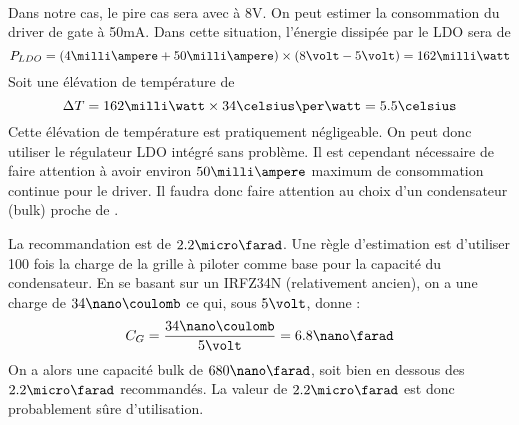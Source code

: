 \paragraph{}
Dans notre cas, le pire cas sera avec \vout{} à 8V.
On peut estimer la consommation du driver de gate à 50mA.
Dans cette situation, l'énergie dissipée par le LDO sera de 
$$P_{LDO} = (4\milli \ampere + 50 \milli \ampere ) \times (8 \volt - 5\volt) = 162 \milli\watt $$
Soit une élévation de température de 
$$\Delta T = 162 \milli \watt \times 34\celsius\per\watt = 5.5\celsius$$
Cette élévation de température est pratiquement négligeable.
On peut donc utiliser le régulateur LDO intégré sans problème.
Il est cependant nécessaire de faire attention à avoir environ $50\milli\ampere$ maximum de consommation continue pour le driver.
Il faudra donc faire attention au choix d'un condensateur (bulk) proche de \drvcc.

La recommandation est de $2.2\micro\farad$. 
Une règle d'estimation est d'utiliser 100 fois la charge de la grille à piloter comme base pour la capacité du condensateur.
En se basant sur un IRFZ34N (relativement ancien), on a une charge de $34\nano\coulomb$ ce qui, sous $5\volt$, donne :
$$C_G = \frac{34\nano\coulomb}{5\volt} = 6.8\nano\farad$$
On a alors une capacité bulk de $680\nano\farad$, soit bien en dessous des $2.2\micro\farad$ recommandés.
La valeur de $2.2\micro\farad$ est donc probablement sûre d'utilisation.